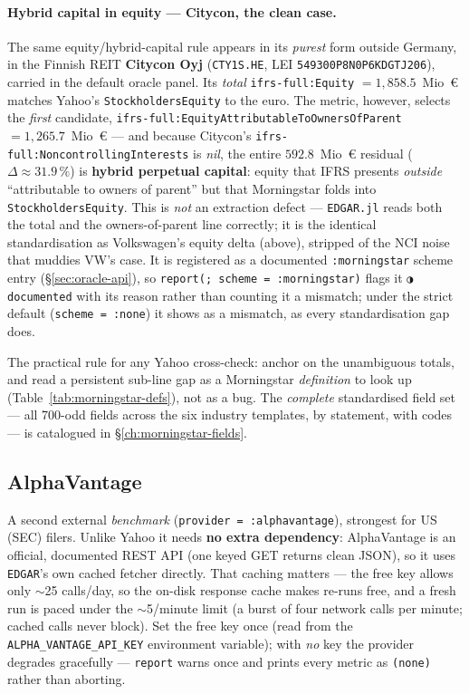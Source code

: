 \documentclass[11pt,a4paper]{report}
\newcommand{\statmark}[1]{{\symbolfont #1}}
\begin{document}
\paragraph{Hybrid capital in equity --- Citycon, the clean case.}\label{par:citycon-equity} The same
equity/hybrid-capital rule appears in its \emph{purest} form outside Germany, in the Finnish REIT
\textbf{Citycon Oyj} (\texttt{CTY1S.HE}, LEI \texttt{549300P8N0P6KDGTJ206}), carried in the default oracle
panel. Its \emph{total} \texttt{ifrs-full:Equity} $=1{,}858.5$~Mio~€ matches Yahoo's
\texttt{StockholdersEquity} to the euro. The metric, however, selects the \emph{first} candidate,
\texttt{ifrs-full:EquityAttributableToOwnersOfParent} $=1{,}265.7$~Mio~€ --- and because Citycon's
\texttt{ifrs-full:NoncontrollingInterests} is \emph{nil}, the entire $592.8$~Mio~€ residual
($\Delta\approx31.9\,\%$) is \textbf{hybrid perpetual capital}: equity that IFRS presents \emph{outside}
``attributable to owners of parent'' but that Morningstar folds into \texttt{StockholdersEquity}. This is
\emph{not} an extraction defect --- \texttt{EDGAR.jl} reads both the total and the owners-of-parent line
correctly; it is the identical standardisation as Volkswagen's equity delta (above), stripped of the NCI
noise that muddies VW's case. It is registered as a documented \texttt{:morningstar} scheme entry
(\S\ref{sec:oracle-api}), so \texttt{report(; scheme = :morningstar)} flags it \texttt{\statmark{◑} documented} with
its reason rather than counting it a mismatch; under the strict default (\texttt{scheme = :none}) it shows
as a mismatch, as every standardisation gap does.

\noindent The practical rule for any Yahoo cross-check: anchor on the unambiguous totals, and read a persistent
sub-line gap as a Morningstar \emph{definition} to look up (Table~\ref{tab:morningstar-defs}), not as a bug. The
\emph{complete} standardised field set --- all 700-odd fields across the six industry templates, by statement,
with codes --- is catalogued in \S\ref{ch:morningstar-fields}.

\subsection{AlphaVantage}\label{sec:alphavantage-oracle}

A second external \emph{benchmark} (\texttt{provider = :alphavantage}), strongest for US (SEC) filers. Unlike
Yahoo it needs \textbf{no extra dependency}: AlphaVantage is an official, documented REST API (one keyed GET
returns clean JSON), so it uses \texttt{EDGAR}'s own cached fetcher directly. That caching matters --- the free key allows only \(\sim\)25 calls/day, so the on-disk
response cache makes re-runs free, and a fresh run is paced under the \(\sim\)5/minute limit (a burst of
four network calls per minute; cached calls never block). Set the free key once (read from the
\texttt{ALPHA\_VANTAGE\_API\_KEY} environment variable); with \emph{no} key the provider degrades
gracefully --- \texttt{report} warns once and prints every metric as \texttt{(none)} rather than aborting.
\end{document}
